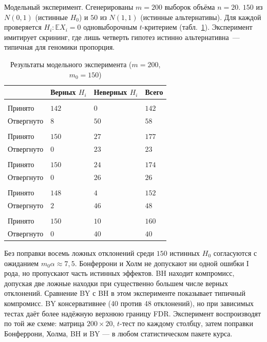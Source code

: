 Модельный эксперимент. Сгенерированы $m=200$ выборок объёма $n=20$. $150$ из $N(0,1)$ (истинные $H_0$) и $50$ из $N(1,1)$ (истинные альтернативы).
Для каждой проверяется $H_i\colon\mathbb EX_i=0$ одновыборочным $t$-критерием (табл.~\ref{tab:model-mht}).
Эксперимент имитирует скрининг, где лишь четверть гипотез истинно альтернативна~--- типичная для геномики пропорция.

\begin{table}[htbp]
    \centering
    \caption{Результаты модельного эксперимента ($m=200$, $m_0=150$)}
    \label{tab:model-mht}
    \footnotesize
    \begin{tabularx}{\linewidth}{|>{\raggedright\arraybackslash}X|>{\centering\arraybackslash}X|>{\centering\arraybackslash}X|>{\centering\arraybackslash}X|}
        \hline
        & Верных $H_i$ & Неверных $H_i$ & Всего \\
        \hline
        \multicolumn{4}{|l|}{\textsc{Без поправки}} \\
        \hline
        Принято & $142$ & $0$ & $142$ \\
        Отвергнуто & $8$ & $50$ & $58$ \\
        \hline
        \multicolumn{4}{|l|}{\textsc{Бонферрони}} \\
        \hline
        Принято & $150$ & $27$ & $177$ \\
        Отвергнуто & $0$ & $23$ & $23$ \\
        \hline
        \multicolumn{4}{|l|}{\textsc{Холм}} \\
        \hline
        Принято & $150$ & $24$ & $174$ \\
        Отвергнуто & $0$ & $26$ & $26$ \\
        \hline
        \multicolumn{4}{|l|}{\textsc{BH ($\alpha=0{,}05$)}} \\
        \hline
        Принято & $148$ & $4$ & $152$ \\
        Отвергнуто & $2$ & $46$ & $48$ \\
        \hline
        \multicolumn{4}{|l|}{\textsc{BY ($\alpha=0{,}05$)}} \\
        \hline
        Принято & $150$ & $10$ & $160$ \\
        Отвергнуто & $0$ & $40$ & $40$ \\
        \hline
    \end{tabularx}
\end{table}

Без поправки восемь ложных отклонений среди $150$ истинных $H_0$ согласуются с ожиданием $m_0\alpha\approx 7{,}5$.
Бонферрони и Холм не допускают ни одной ошибки I рода, но пропускают часть истинных эффектов. BH находит компромисс, допуская две ложные находки при существенно большем числе верных отклонений.
Сравнение BY с BH в этом эксперименте показывает типичный компромисс. BY консервативнее (40 против 48 отклонений), но при зависимых тестах даёт более надёжную верхнюю границу FDR.
Эксперимент воспроизводят по той же схеме: матрица $200\times 20$, $t$-тест по каждому столбцу, затем поправки Бонферрони, Холма, BH и BY --- в любом статистическом пакете курса.

